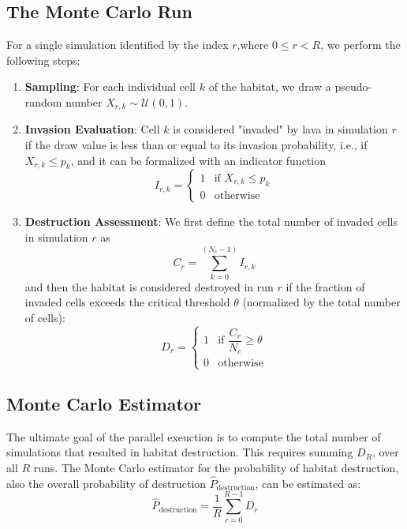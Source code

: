 \subsection{The Monte Carlo Run}\label{subsec:monte_carlo_run}
For a single simulation identified by the index $r$,where $0 \leq r < R$, we perform the following steps:
\begin{enumerate}
    \item \textbf{Sampling}: For each individual cell $k$ of the habitat, we draw a pseudo-random number $X_{r, k} \sim \mathcal{U}(0, 1)$.
    \item \textbf{Invasion Evaluation}: Cell $k$ is considered "invaded" by lava in simulation $r$ if the draw value is less than or equal to its invasion probability, i.e., if $X_{r, k} \leq p_k$, and it can be formalized with an indicator function
    \begin{equation}
        I_{r, k} = \begin{cases}
            1 & \text{if } X_{r, k} \leq p_k \\
            0 & \text{otherwise}
        \end{cases}
    \end{equation}
    \item \textbf{Destruction Assessment}: We first define the total number of invaded cells in simulation $r$ as
    \begin{equation}
        C_r = \sum_{k=0}^{(N_c-1)} I_{r, k}
    \end{equation}
    and then the habitat is considered destroyed in run $r$ if the fraction of invaded cells exceeds the critical threshold $\theta$ (normalized by the total number of cells):
    \begin{equation}
        D_r = \begin{cases}
            1 & \text{if } \dfrac{C_r}{N_c} \geq \theta \\
            0 & \text{otherwise}
        \end{cases}
    \end{equation}
\end{enumerate}

\subsection{Monte Carlo Estimator}\label{subsec:monte_carlo_estimator}
The ultimate goal of the parallel exeuction is to compute the total number of simulations that resulted in habitat destruction. This requires summing $D_R$, over all $R$ runs. The Monte Carlo estimator for the probability of habitat destruction, also the overall probability of destruction $\hat{P}_{\text{destruction}}$, can be estimated as:
\begin{equation}
    \hat{P}_{\text{destruction}} = \frac{1}{R} \sum_{r=0}^{R-1}D_r
\end{equation}

